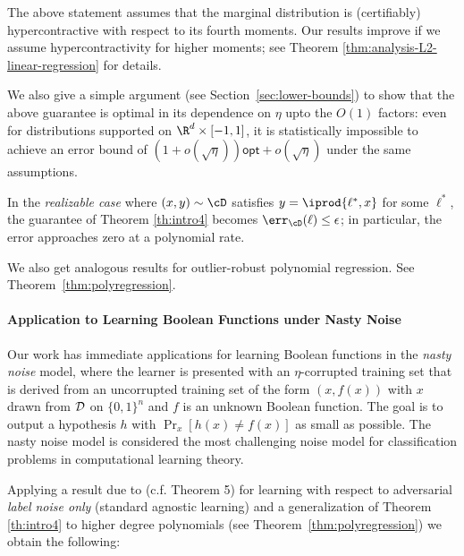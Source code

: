 The above statement assumes that the marginal distribution is (certifiably) hypercontractive with respect to its fourth moments.  Our results improve if we assume hypercontractivity for higher moments; see Theorem \ref{thm:analysis-L2-linear-regression} for details. 

We also give a simple argument (see Section~\ref{sec:lower-bounds}) to show that the above guarantee is optimal in its dependence on $\eta$ upto the $O(1)$ factors: even for distributions supported on $\R^d \times [-1,1]$, it is statistically impossible to achieve an error bound of $(1 + o(\sqrt{\eta})) \mathsf{opt} + o(\sqrt{\eta})$ under the same assumptions. 

In the \emph{realizable case} where $(x,y) \sim \cD$ satisfies $y = \iprod{\ell^*,x}$ for some $\ell^*$, the guarantee of Theorem \ref{th:intro4} becomes $\err_\cD(\ell) \leq \epsilon$; in particular, the error approaches zero at a polynomial rate. 

We also get analogous results for outlier-robust polynomial regression. See Theorem~\ref{thm:polyregression}.

 \paragraph{Application to Learning Boolean Functions under Nasty Noise}  Our work has immediate applications for learning Boolean functions in the {\em nasty noise} model, where the learner is presented with an $\eta$-corrupted training set that is derived from an uncorrupted training set of the form $(x,f(x))$ with $x$ drawn from ${\cal D}$ on $\{0,1\}^n$ and $f$ is an unknown Boolean function.  The goal is to output a hypothesis $h$ with $\Pr_{x}[h(x) \neq f(x)]$ as small as possible. The nasty noise model is considered the most challenging noise model for classification problems in computational learning theory. 

Applying a result due to \citet{DBLP:journals/siamcomp/KalaiKMS08} (c.f. Theorem 5) for learning with respect to adversarial {\em label noise only} (standard agnostic learning) and a generalization of Theorem \ref{th:intro4} to higher degree polynomials (see Theorem~\ref{thm:polyregression}) we obtain the following:

